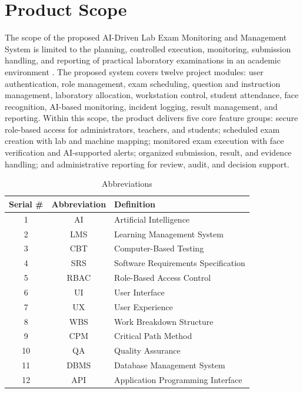\section{Product Scope}

The scope of the proposed AI-Driven Lab Exam Monitoring and Management System is limited to the planning, controlled execution, monitoring, submission handling, and reporting of practical laboratory examinations in an academic environment \cite{scope1}. The proposed system covers twelve project modules: user authentication, role management, exam scheduling, question and instruction management, laboratory allocation, workstation control, student attendance, face recognition, AI-based monitoring, incident logging, result management, and reporting. Within this scope, the product delivers five core feature groups: secure role-based access for administrators, teachers, and students; scheduled exam creation with lab and machine mapping; monitored exam execution with face verification and AI-supported alerts; organized submission, result, and evidence handling; and administrative reporting for review, audit, and decision support.

\begin{table}[!ht]
    \caption{Abbreviations}
    \label{tab:Abbreviations}
    \centering
    \begin{tabular}{ccl} 
        \hline
        \textbf{Serial \#} & \textbf{Abbreviation} & \textbf{Definition} \\
        \hline
        1 & AI & Artificial Intelligence \\
        2 & LMS & Learning Management System \\
        3 & CBT & Computer-Based Testing \\
        4 & SRS & Software Requirements Specification \\
        5 & RBAC & Role-Based Access Control \\
        6 & UI & User Interface \\
        7 & UX & User Experience \\
        8 & WBS & Work Breakdown Structure \\
        9 & CPM & Critical Path Method \\
        10 & QA & Quality Assurance \\
        11 & DBMS & Database Management System \\
        12 & API & Application Programming Interface \\
        \hline
    \end{tabular}
\end{table}


